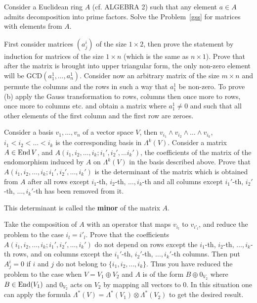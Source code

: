 \documentclass[12pt]{article}
\begin{document}
\begin{zadacha}[*]
Consider a Euclidean ring $A$ (cf. ALGEBRA 2) such that any element
$a \in A$ admits decomposition into prime factors. Solve the
Problem~\ref{gss} for matrices with elements from $A$.
\end{zadacha}

\begin{ukazanie}
First consider matrices $(a^i_j)$ of the size $1 \times 2$, then
prove the statement by induction for matrices of the size $1 \times
n$ (which is the same as $n \times 1$).
Prove that after the matrix is brought into upper triangular form, the
only non-zero element will be GCD$(a^1_1,\dots,a^1_n)$.
Consider now an arbitrary matrix of the size $m \times n$ and permute
the columns and the rows in such a way that $a^1_1$ be non-zero. 
To prove (b) apply the Gauss transformation to rows, columns then once
more to rows, once more to columns etc. and obtain a matrix where
$a^1_1 \neq 0$ and such that all other elements of the first column
and the first row are zeroes. 
\end{ukazanie}



\begin{zadacha}[!]
Consider a basis $v_1, \dots, v_n$ of a vector space $V$, then
$v_{i_1} \wedge v_{i_2} \wedge \dots \wedge v_{i_k}$, 
$i_1< i_2< \dots < i_k$ is the corresponding basis in $\Lambda^k(V)$.
Consider a matrix $A\in \operatorname{End} V$, and $A(i_1, i_2, \dots, i_k;i_1',
i_2', \dots i_k')$, the coefficients of the matrix of the endomorphism
induced by $A$ on $\Lambda^k(V)$ in the basis described above. Prove
that $A(i_1, i_2, \dots, i_k;i_1', i_2', \dots, i_k')$ is the
determinant of the matrix which is obtained from $A$ after all rows
except $i_1$-th, $i_2$-th, $\ldots, i_k$-th and all columns except
$i_1'$-th, $i_2'$-th, $\ldots, i_k'$-th has been removed from it.
\end{zadacha}

\begin{zamechanie}
This determinant is called the {\bf minor} of the matrix $A$.
\end{zamechanie}

\begin{ukazanie}
  Take the composition of $A$ with an operator that maps $v_{i_l}$ to
  $v_{i'_l}$, and reduce the problem to the case $i_l=i'_l$. Prove
  that the coefficients $A(i_1, i_2, \dots, i_k;i_1', i_2', \dots,
  i_k')$ do not depend on rows except the $i_1$-th, $i_2$-th, $\ldots,
  i_k$-th rows, and on columns except the $i_1'$-th, $i_2'$-th,
  $\ldots, i_k'$-th columns. Then put $A^i_j=0$ if $i$ and $j$ do not
  belong to $\{ i_1, i_2, \dots, i_k\}$. Thus you have reduced the
  problem to the case when $V= V_1 \oplus V_2$ and $A$ is of the form
  $B\oplus 0_{V_2}$ where $B\in \operatorname{End}(V_1)$ and $0_{V_2}$ acts on $V_2$
  by mapping all vectors to $0$. In this situation one can apply the
  formula $\Lambda^*(V) = \Lambda^*(V_1)\otimes \Lambda^*(V_2)$ to get
  the desired result.
\end{ukazanie}
\end{document}
